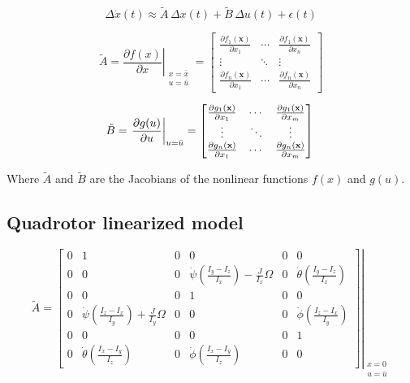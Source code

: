 \documentclass[12pt]{article}
\begin{document}
\begin{equation}
\label{eq:linearization}
\Delta\dot{x}(t) \approx  \tilde{A} \, \Delta x(t) + \tilde{B} \, \Delta u(t) + \epsilon (t)
\end{equation}

\begin{equation}
\label{eq:jacobian-f}
\tilde{A} = \left. \frac{ \partial f(x)} {\partial x} \right|_{\begin{smallmatrix} x = \bar{x} \\ u = \bar{u} \end{smallmatrix}} = \begin{bmatrix}
\frac{\partial f_1(\mathbf{x})}{\partial x_1} & \cdots & \frac{\partial f_1(\mathbf{x})}{\partial x_n} \\
\vdots & \ddots & \vdots \\
\frac{\partial f_n(\mathbf{x})}{\partial x_1} & \cdots & \frac{\partial f_n(\mathbf{x})}{\partial x_n}
\end{bmatrix}
\end{equation}

\begin{equation}
\label{eq:jacobian-g}
\tilde{B} = \left. \frac{\partial g(u)} {\partial u} \right|_{u = \bar{u}} = \begin{bmatrix}
\frac{\partial g_1(\mathbf{x})}{\partial x_1} & \cdots & \frac{\partial g_1(\mathbf{x})}{\partial x_m} \\
\vdots & \ddots & \vdots \\
\frac{\partial g_n(\mathbf{x})}{\partial x_1} & \cdots & \frac{\partial g_n(\mathbf{x})}{\partial x_m}
\end{bmatrix} \\
\end{equation}

Where $\tilde{A}$ and $\tilde{B}$ are the Jacobians of the nonlinear functions $f(x)$ and $g(u)$.

\subsection{Quadrotor linearized model}

$$ \tilde{A} = 
{\left. \begin{bmatrix}
0 & 1 & 0 & 0 & 0 & 0 \\ 
0 & 0 & 0 & \dot{\psi} \left (\frac{I_y - I_z}{I_x} \right ) - \frac{J}{I_x} \Omega & 0 & \dot{\theta} \left (\frac{I_y - I_z}{I_x} \right ) \\ 
0 & 0 & 0 & 1 & 0 & 0 \\ 
0 & \dot{\psi} \left (\frac{I_z - I_x}{I_y} \right ) + \frac{J}{I_y} \Omega & 0 & 0 & 0 & \dot{\phi} \left (\frac{I_z - I_x}{I_y} \right ) \\ 
0 & 0 & 0 & 0 & 0 & 1 \\ 
0 & \dot{\theta} \left (\frac{I_x - I_y}{I_z} \right ) & 0 & \dot{\phi} \left (\frac{I_x - I_y}{I_z} \right ) & 0 & 0
\end{bmatrix} \right |}_{\begin{smallmatrix} x = 0 \\ u = \bar{u} \end{smallmatrix}} $$
\end{document}
